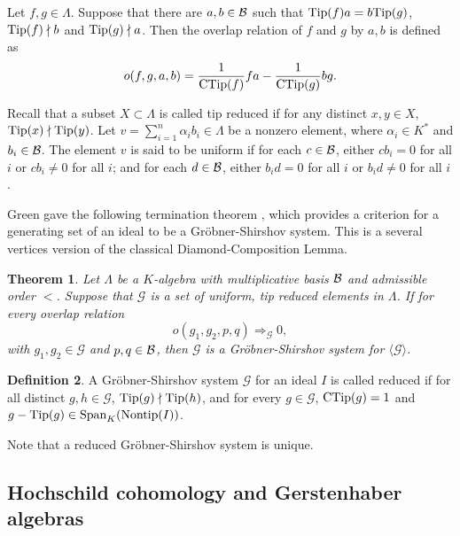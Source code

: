 \documentclass[10pt, reqno]{amsart}
\newtheorem{theorem}{Theorem}[section]
\theoremstyle{definition}
\newtheorem{definition}[theorem]{Definition}
\theoremstyle{remark}
\numberwithin{equation}{section}
\begin{document}
Let \( f, g \in \Lambda \). Suppose that there are \( a, b \in \mathcal{B} \) such that $\mathrm{Tip}(f)a = b\mathrm{Tip}(g)$, $\mathrm{Tip}(f) \nmid b$ and $\mathrm{Tip}(g) \nmid a$.
Then the overlap relation of \( f \) and \( g \) by \( a,b \) is defined as
\[
o(f, g, a, b) = \frac{1}{\mathrm{CTip}(f)} f a - \frac{1}{\mathrm{CTip}(g)} b g.
\]

Recall that a  subset \(X\subset \Lambda\) is called tip reduced if for any distinct \(x,y \in X\), \( \mathrm{Tip}(x) \nmid \mathrm{Tip}(y)\).
Let \(v = \sum_{i=1}^{n} \alpha_i b_i \in \Lambda\) be a nonzero element, where \(\alpha_i \in K^*\) and \(b_i \in \mathcal{B}\). The element \(v\) is said to be  uniform if for each \(c \in \mathcal{B}\), either \(cb_i = 0\) for all \(i\)  or \(cb_i \neq 0\) for all \(i\); and for each \(d \in \mathcal{B}\), either \(b_id = 0\) for all \(i\) or \(b_id \neq 0\) for all \(i\).

Green gave the following termination theorem \cite[Theorem 2.3]{Gre99}, which provides a criterion for a generating set of an ideal to be a Gr\"obner-Shirshov system.  This is a several vertices version of the classical Diamond-Composition Lemma. 
\begin{theorem} \label{thm: GS basis}
    Let \( \Lambda \) be a \( K \)-algebra with multiplicative basis \( \mathcal{B} \) and admissible order \( < \). Suppose that \( \mathscr{G}\) is a set of uniform, tip reduced elements in \( \Lambda \). If for every overlap relation
\[
o(g_1, g_2, p, q) \Rightarrow_\mathscr{G} 0,
\]
with \( g_1, g_2 \in \mathscr{G} \) and \(p,q \in \mathcal{B} \), then \( \mathscr{G} \) is a Gr\"obner-Shirshov system for \( \langle \mathscr{G} \rangle \).
\end{theorem}

\begin{definition}\label{regs}
    A Gr\"obner-Shirshov system \(\mathscr{G}\) for an ideal  \(I\) is called reduced if for all distinct \(g,h \in \mathscr{G}\), \( \mathrm{Tip}(g) \nmid \mathrm{Tip}(h)\), and for every $g \in \mathscr{G}$, $\mathrm{CTip}(g) = 1$ and $g - \mathrm{Tip}(g) \in \mathrm{Span}_K(\mathrm{Nontip}(I))$.
\end{definition}

Note that a reduced Gr\"obner-Shirshov system  is unique. 




\subsection{Hochschild cohomology and Gerstenhaber algebras}\mbox{}
\end{document}
